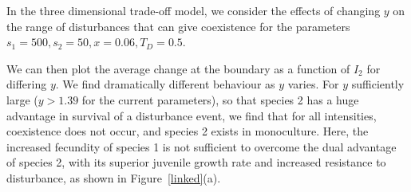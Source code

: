 \documentclass[preprint,10pt,reqno]{report}
\begin{document}
In the three dimensional trade-off model, we consider the effects of changing $y$ on the range of disturbances that can give coexistence for the parameters $s_1=500,s_2=50,x=0.06,T_D=0.5$.

We can then plot the average change at the boundary as a function of $I_2$ for differing $y$. We find dramatically different behaviour as $y$ varies. For $y$ sufficiently large ($y>1.39$ for the current parameters), so that species 2 has a huge advantage in survival of a disturbance event, we find that for all intensities, coexistence does not occur, and species 2 exists in monoculture. Here, the increased fecundity of species 1 is not sufficient to overcome the dual advantage of species 2, with its superior juvenile growth rate and increased resistance to disturbance, as shown in Figure~\ref{linked}(a).
\end{document}
